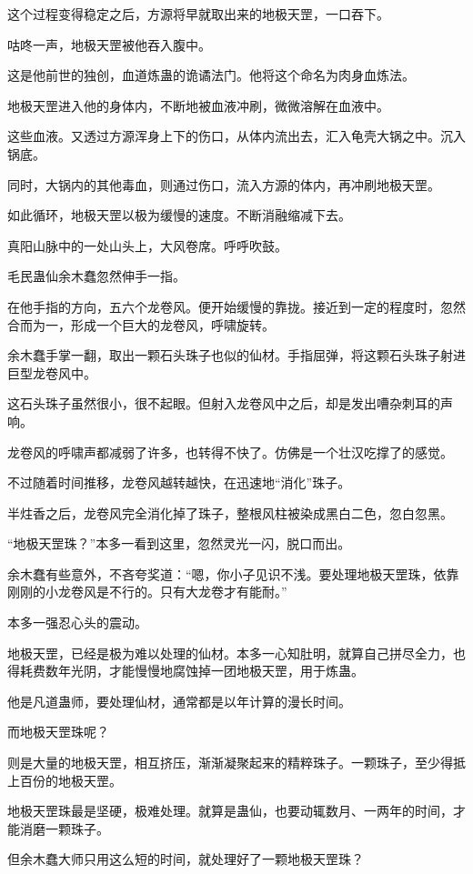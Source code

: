 \begin{this_body}
这个过程变得稳定之后，方源将早就取出来的地极天罡，一口吞下。

咕咚一声，地极天罡被他吞入腹中。

这是他前世的独创，血道炼蛊的诡谲法门。他将这个命名为肉身血炼法。

地极天罡进入他的身体内，不断地被血液冲刷，微微溶解在血液中。

这些血液。又透过方源浑身上下的伤口，从体内流出去，汇入龟壳大锅之中。沉入锅底。

同时，大锅内的其他毒血，则通过伤口，流入方源的体内，再冲刷地极天罡。

如此循环，地极天罡以极为缓慢的速度。不断消融缩减下去。

真阳山脉中的一处山头上，大风卷席。呼呼吹鼓。

毛民蛊仙余木蠢忽然伸手一指。

在他手指的方向，五六个龙卷风。便开始缓慢的靠拢。接近到一定的程度时，忽然合而为一，形成一个巨大的龙卷风，呼啸旋转。

余木蠢手掌一翻，取出一颗石头珠子也似的仙材。手指屈弹，将这颗石头珠子射进巨型龙卷风中。

这石头珠子虽然很小，很不起眼。但射入龙卷风中之后，却是发出嘈杂刺耳的声响。

龙卷风的呼啸声都减弱了许多，也转得不快了。仿佛是一个壮汉吃撑了的感觉。

不过随着时间推移，龙卷风越转越快，在迅速地“消化”珠子。

半炷香之后，龙卷风完全消化掉了珠子，整根风柱被染成黑白二色，忽白忽黑。

“地极天罡珠？”本多一看到这里，忽然灵光一闪，脱口而出。

余木蠢有些意外，不吝夸奖道：“嗯，你小子见识不浅。要处理地极天罡珠，依靠刚刚的小龙卷风是不行的。只有大龙卷才有能耐。”

本多一强忍心头的震动。

地极天罡，已经是极为难以处理的仙材。本多一心知肚明，就算自己拼尽全力，也得耗费数年光阴，才能慢慢地腐蚀掉一团地极天罡，用于炼蛊。

他是凡道蛊师，要处理仙材，通常都是以年计算的漫长时间。

而地极天罡珠呢？

则是大量的地极天罡，相互挤压，渐渐凝聚起来的精粹珠子。一颗珠子，至少得抵上百份的地极天罡。

地极天罡珠最是坚硬，极难处理。就算是蛊仙，也要动辄数月、一两年的时间，才能消磨一颗珠子。

但余木蠢大师只用这么短的时间，就处理好了一颗地极天罡珠？


\end{this_body}
